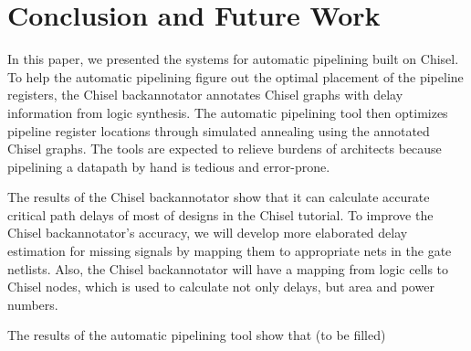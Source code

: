 \section{Conclusion and Future Work}
In this paper, we presented the systems for automatic pipelining built on Chisel. To help the automatic pipelining figure out the optimal placement of the pipeline registers, the Chisel backannotator annotates Chisel graphs with delay information from logic synthesis. The automatic pipelining tool then optimizes pipeline register locations through simulated annealing using the annotated Chisel graphs. The tools are expected to relieve burdens of architects because pipelining a datapath by hand is tedious and error-prone.

The results of the Chisel backannotator show that it can calculate accurate critical path delays of most of designs in the Chisel tutorial. To improve the Chisel backannotator's accuracy, we will develop more elaborated delay estimation for missing signals by mapping them to appropriate nets in the gate netlists. Also, the Chisel backannotator will have a mapping from logic cells to Chisel nodes, which is used to calculate not only delays, but area and power numbers.

The results of the automatic pipelining tool show that (to be filled)